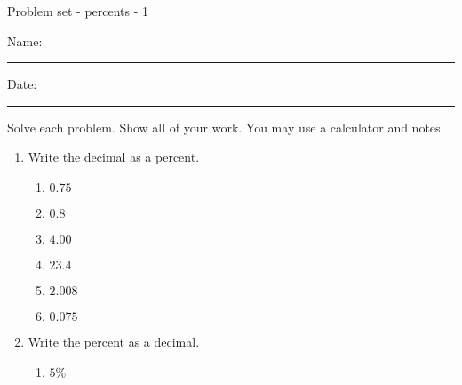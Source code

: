 \documentclass[12pt]{article}
\begin{document}
\pagestyle{empty} %
\begin{center}
          Problem set - percents - 1 \\[0.5in]
\end{center}
Name: \rule{4in}{0.005in} Date: \rule{1in}{0.005in} 
  \vspace{0.25in}

Solve each problem. Show all of your work. You may use a calculator and notes. 

\begin{enumerate}
\item Write the decimal as a percent. 
\begin{multicols}{2}
\begin{enumerate}

\item \hspace{0.50in} $0.75$
  \vspace{0.25in}

\item \hspace{0.50in} $0.8$
  \vspace{0.25in}

\item \hspace{0.50in} $4.00$
  \vspace{0.25in}

\item \hspace{0.50in} $23.4$
  \vspace{0.25in}

\item \hspace{0.50in} $2.008$
  \vspace{0.25in}

\item \hspace{0.50in} $0.075$
  \vspace{0.25in}

\end{enumerate}
\end{multicols}
\item Write the percent as a decimal.
\begin{multicols}{2}
\begin{enumerate}

\item \hspace{0.5in} $5\%$
  \vspace{0.25in}


\end{enumerate}
\end{multicols}
\end{enumerate}
\end{document}
